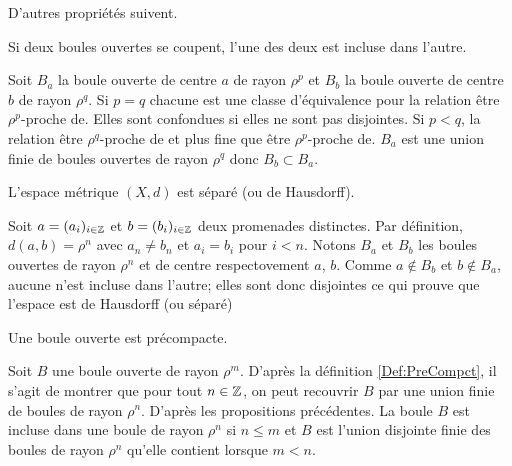 D'autres propriétés suivent.
\begin{prop}
 Si deux boules ouvertes se coupent, l'une des deux est incluse dans l'autre.
\end{prop}
\begin{demo}
Soit $B_a$ la boule ouverte de centre $a$ de rayon $\rho^p$ et $B_b$ la boule ouverte de centre $b$ de rayon $\rho^q$.\newline
Si $p=q$ chacune est une classe d'équivalence pour la relation \og être $\rho^p$-proche de\fg{}. Elles sont confondues si elles ne sont pas disjointes.\newline
Si $p < q$, la relation \og être $\rho^q$-proche de\fg{} et plus fine que \og être $\rho^p$-proche de\fg{}. $B_a$ est une union finie de boules ouvertes de rayon $\rho^q$ donc $B_b \subset B_a$.
\end{demo}

 
\begin{propn}\label{Prop:PromHausdorff}
 L'espace métrique $(X,d)$ est séparé (ou de Hausdorff).
\end{propn}
\begin{demo}
 Soit $a=(a_i)_{i\in \mathbb{Z}}$ et $b=(b_i)_{i\in \mathbb{Z}}$ deux promenades distinctes. Par définition, $d(a,b)=\rho^n$ avec $a_n \neq b_n$ et $a_i = b_i$ pour $i<n$. Notons $B_a$ et $B_b$ les boules ouvertes de rayon $\rho^n$ et de centre respectovement $a$, $b$. Comme $a\notin B_b$ et $b\notin B_a$, aucune n'est incluse dans l'autre; elles sont donc disjointes ce qui prouve que l'espace est de Hausdorff (ou séparé)
\end{demo}

\begin{propn}\label{Prop:BoulPreCompct}
 Une boule ouverte est précompacte.
\end{propn}
\begin{demo}
 Soit $B$ une boule ouverte de rayon $\rho^m$. D'après la définition \ref{Def:PreCompct}, il s'agit de montrer que pour tout $n\in \mathbb{Z}$, on peut recouvrir $B$ par une union finie de boules de rayon $\rho^n$.\newline
 D'après les propositions précédentes. La boule $B$ est incluse dans une boule de rayon $\rho^n$ si $n \leq m$ et $B$ est l'union disjointe finie des boules de rayon $\rho^n$ qu'elle contient lorsque $m < n$.
\end{demo}

